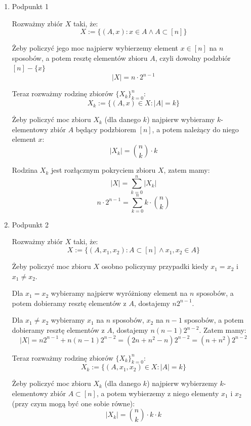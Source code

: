 \documentclass{mwart}
\begin{document}
\begin{mdframed}
    \begin{enumerate}
        \item Podpunkt 1

        Rozważmy zbiór $X$ taki, że:
        \[X := \{ (A, x) : x \in A \wedge A \subset [n]\}\]

        Żeby policzyć jego moc najpierw wybierzemy element $x \in [n]$ na $n$ sposobów, 
        a potem resztę elementów zbioru $A$, czyli dowolny podzbiór $[n]-\{x\}$
        \[|X| = n \cdot 2^{n-1}\] 

        Teraz rozważmy rodzinę zbiorów $\{X_k\}_{k=0}^n$:
        \[X_k := \{(A, x) \in X : |A| = k\}\]

        Żeby policzyć moc zbioru $X_k$ (dla danego $k$) najpierw wybieramy $k$-elementowy zbiór $A$ będący podzbiorem $[n]$, a potem należący
        do niego element $x$:
        \[|X_k| = {n \choose k} \cdot k\]  

        Rodzina $X_k$ jest rozłącznym pokryciem zbioru $X$, zatem mamy:
        \[|X| = \sum_{k=0}^{n} |X_k|\]
        \[n \cdot 2^{n-1} = \sum_{k=0}^{n} k \cdot {n \choose k}\]

        \item Podpunkt 2

        Rozważmy zbiór $X$ taki, że:
        \[X := \{(A, x_1, x_2) : A \subset [n] \wedge x_1, x_2 \in A\}\]

        Żeby policzyć moc zbioru $X$ osobno policzymy przypadki kiedy $x_1 = x_2$ i $x_1 \neq x_2$.

        Dla $x_1 = x_2$ wybieramy najpierw wyróżniony element na $n$ sposobów, a potem dobieramy resztę elementów z $A$, 
        dostajemy $n2^{n-1}$.

        Dla $x_1 \neq x_2$ wybieramy $x_1$ na $n$ sposobów, $x_2$ na $n-1$ sposobów, a potem dobieramy resztę elementów z $A$, 
        dostajemy $n(n-1)2^{n-2}$. 
        Zatem mamy:
        \[|X| = n2^{n-1} + n(n-1)2^{n-2} = (2n + n^2 - n)2^{n-2} = (n + n^2)2^{n-2}\]

        Teraz rozważmy rodzinę zbiorów $\{X_k\}_{k=0}^n$:
        \[X_k := \{(A, x_1, x_2) \in X : |A| = k\}\]

        Żeby policzyć moc zbioru $X_k$ (dla danego $k$) najpierw wybierzemy $k$-elementowy zbiór $A \subset [n]$, a potem wybierzemy z niego elementy 
        $x_1$ i $x_2$ (przy czym mogą być one sobie równe):
        \[|X_k| = {n \choose k} \cdot k\cdot k\]


\end{enumerate}
\end{mdframed}
\end{document}
